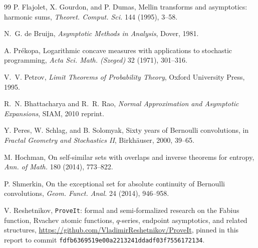 \documentclass[11pt]{article}
\theoremstyle{definition}
\theoremstyle{remark}
\newcommand{\repo}{\texttt{ProveIt}}
\begin{document}
\begin{thebibliography}{99}
P. Flajolet, X. Gourdon, and P. Dumas,
\newblock Mellin transforms and asymptotics: harmonic sums,
\newblock \emph{Theoret. Comput. Sci.} 144 (1995), 3--58.

N.~G. de Bruijn,
\newblock \emph{Asymptotic Methods in Analysis},
\newblock Dover, 1981.

A. Pr\'ekopa,
\newblock Logarithmic concave measures with applications to stochastic
programming,
\newblock \emph{Acta Sci. Math. (Szeged)} 32 (1971), 301--316.

V.~V. Petrov,
\newblock \emph{Limit Theorems of Probability Theory},
\newblock Oxford University Press, 1995.

R.~N. Bhattacharya and R.~R. Rao,
\newblock \emph{Normal Approximation and Asymptotic Expansions},
\newblock SIAM, 2010 reprint.

Y. Peres, W. Schlag, and B. Solomyak,
\newblock Sixty years of Bernoulli convolutions,
\newblock in \emph{Fractal Geometry and Stochastics II}, Birkh\"auser, 2000,
39--65.

M. Hochman,
\newblock On self-similar sets with overlaps and inverse theorems for entropy,
\newblock \emph{Ann. of Math.} 180 (2014), 773--822.

P. Shmerkin,
\newblock On the exceptional set for absolute continuity of Bernoulli
convolutions,
\newblock \emph{Geom. Funct. Anal.} 24 (2014), 946--958.

V. Reshetnikov,
\newblock \repo: formal and semi-formalized research on the Fabius function,
Rvachev atomic functions, \(q\)-series, endpoint asymptotics, and related
structures,
\newblock \url{https://github.com/VladimirReshetnikov/ProveIt}, pinned in this
report to commit \texttt{fdfb6369519e00a2213241ddadf03f7556172134}.

\end{thebibliography}
\end{document}
